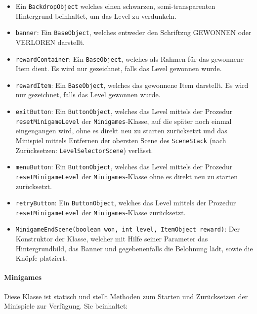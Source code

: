 \begin{sloppypar}
    \begin{itemize}
        \item Ein \texttt{BackdropObject} welches einen schwarzen, semi-transparenten Hintergrund beinhaltet, um das Level zu verdunkeln.
        \item \texttt{banner}: Ein \texttt{BaseObject}, welches entweder den Schriftzug \glqq GEWONNEN\grqq{} oder \glqq VERLOREN\grqq{} darstellt.
        \item \texttt{rewardContainer}: Ein \texttt{BaseObject}, welches als Rahmen für das gewonnene Item dient.
            Es wird nur gezeichnet, falls das Level gewonnen wurde.
        \item \texttt{rewardItem}: Ein \texttt{BaseObject}, welches das gewonnene Item darstellt.
            Es wird nur gezeichnet, falls das Level gewonnen wurde.
        \item \texttt{exitButton}: Ein \texttt{ButtonObject}, welches das Level mittels der Prozedur \texttt{resetMinigameLevel} der \texttt{Minigames}-Klasse, auf die später noch einmal eingengangen wird, ohne es direkt neu zu starten zurücksetzt und das Minispiel mittels Entfernen der obersten Scene des \texttt{SceneStack} (nach Zurücksetzen: \texttt{LevelSelectorScene}) verlässt.
        \item \texttt{menuButton}: Ein \texttt{ButtonObject}, welches das Level mittels der Prozedur \texttt{resetMinigameLevel} der \texttt{Minigames}-Klasse ohne es direkt neu zu starten zurücksetzt.
        \item \texttt{retryButton}: Ein \texttt{ButtonObject}, welches das Level mittels der Prozedur \texttt{resetMinigameLevel} der \texttt{Minigames}-Klasse zurücksetzt.
        \item \texttt{MinigameEndScene(boolean won, int level, ItemObject reward)}: Der Konstruktor der Klasse, welcher mit Hilfe seiner Parameter das Hintergrundbild, das Banner und gegebenenfalls die Belohnung lädt, sowie die Knöpfe platziert.
    \end{itemize}
\end{sloppypar}

\paragraph{Minigames} Diese Klasse ist statisch und stellt Methoden zum Starten und Zurücksetzen der Minispiele zur Verfügung.
Sie beinhaltet:

